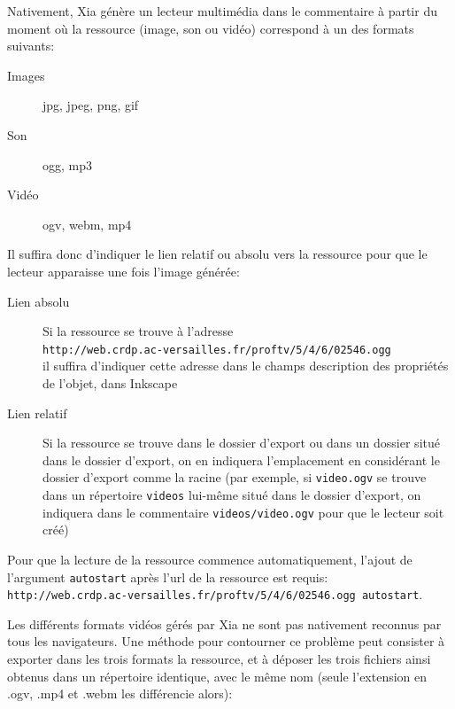 \documentclass[a4paper,12pt]{report}
\begin{document}
Nativement, Xia génère un lecteur multimédia dans le commentaire à partir du moment où la ressource (image, son ou vidéo)
correspond à un des formats suivants:
\begin{description}
 \item [Images] jpg, jpeg, png, gif
 \item [Son] ogg, mp3
 \item [Vidéo] ogv, webm, mp4
\end{description}

Il suffira donc d'indiquer le lien relatif ou absolu vers la ressource pour que le lecteur apparaisse une fois l'image générée:
\begin{description}
 \item [Lien absolu] Si la ressource se trouve à l'adresse\\
 \verb|http://web.crdp.ac-versailles.fr/proftv/5/4/6/02546.ogg|\\
 il suffira d'indiquer cette adresse dans le champs description des propriétés de l'objet, dans Inkscape
 \item [Lien relatif] Si la ressource se trouve dans le dossier d'export ou dans un dossier situé dans le dossier d'export, on en indiquera
 l'emplacement en considérant le dossier d'export comme la racine
 (par exemple, si \verb|video.ogv| se trouve dans un répertoire \verb|videos| lui-même situé dans le dossier d'export, on indiquera dans
 le commentaire \verb|videos/video.ogv| pour que le lecteur soit créé)
\end{description}

Pour que la lecture de la ressource commence automatiquement, l'ajout de l'argument \verb|autostart| 
après l'url de la ressource est requis:\\
\verb|http://web.crdp.ac-versailles.fr/proftv/5/4/6/02546.ogg autostart|.

Les différents formats vidéos gérés par Xia ne sont pas nativement reconnus par tous les navigateurs.
Une méthode pour contourner ce problème peut consister à exporter dans les trois formats la ressource,
et à déposer les trois fichiers ainsi obtenus dans un répertoire identique, avec le même nom (seule l'extension
en .ogv, .mp4 et .webm les différencie alors):\\
\end{document}
